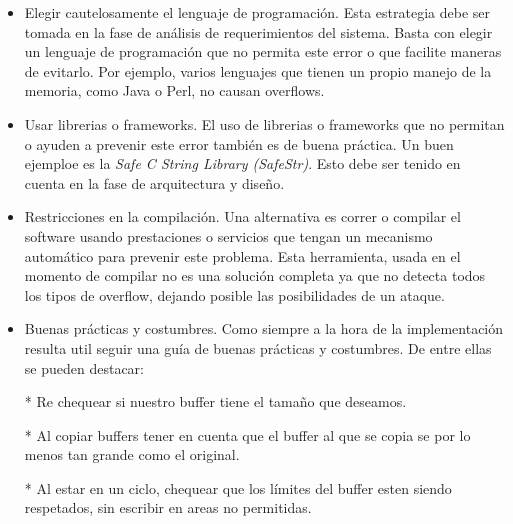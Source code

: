 \begin{itemize}
    \item Elegir cautelosamente el lenguaje de programación. Esta estrategia debe ser tomada en la fase de análisis de requerimientos del sistema.
	Basta con elegir un lenguaje de programación que no permita este error o que facilite maneras de evitarlo.
	Por ejemplo, varios lenguajes que tienen un propio manejo de la memoria, como Java o Perl, no causan overflows.
    \item Usar librerias o frameworks. 
	El uso de librerias o frameworks que no permitan o ayuden a prevenir este error también es de buena práctica.
	Un buen ejemploe es la \textit{Safe C String Library (SafeStr)}.
	Esto debe ser tenido en cuenta en la fase de arquitectura y diseño.
    \item Restricciones en la compilación.
	Una alternativa es correr o compilar el software usando prestaciones o servicios que tengan un mecanismo automático para prevenir este problema.
	Esta herramienta, usada en el momento de compilar no es una solución completa ya que no detecta todos los tipos de overflow, dejando posible las posibilidades de un ataque.
    \item Buenas prácticas y costumbres.
	Como siempre a la hora de la implementación resulta util seguir una guía de buenas prácticas y costumbres.
	De entre ellas se pueden destacar:
	
	* Re chequear si nuestro buffer tiene el tamaño que deseamos.
	
	* Al copiar buffers tener en cuenta que el buffer al que se copia se por lo menos tan grande como el original.
	
	* Al estar en un ciclo, chequear que los límites del buffer esten siendo respetados, sin escribir en areas no permitidas.
	

\end{itemize}

